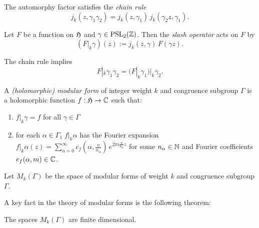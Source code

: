 \begin{lemma}\label{lemma-automorphy-factor-chain-rule}
    The automorphy factor satisfies the \emph{chain rule}
$$j_k(z,\gamma_1\gamma_2)=j_k(z,\gamma_1)\,j_k(\gamma_2z,\gamma_1). $$
\end{lemma}

\begin{definition}\label{def-slash-operator}
    Let $F$ be a  function on $\mathfrak{H}$ and $\gamma\in\mathrm{PSL}_2(\mathbb{Z})$. Then the \emph{slash operator} acts on $F$ by
$$(F|_k\gamma)(z):=j_k(z,\gamma)\,F(\gamma z). $$
\end{definition}

\begin{lemma}\label{lemma-slash-operator-chail-rule}
    The chain rule implies
$$F|_k\gamma_1\gamma_2=(F|_k\gamma_1)|_k\gamma_2.$$
\end{lemma}

\begin{definition}\label{def-holomorphic-modular-form}%
A \emph{(holomorphic) modular form} of integer weight $k$ and congruence subgroup $\Gamma$ is a holomorphic function $f:\mathfrak{H}\to\mathbb{C}$ such that:
\begin{enumerate}
  \item $f|_k\gamma=f$ for all $\gamma\in\Gamma$
  \item for each $\alpha\in\Gamma_1\;f|_k\alpha$ has the Fourier expansion $f|_k\alpha (z)=\sum_{n=0}^\infty c_f(\alpha,\frac{n}{n_\alpha})\,e^{2\pi i \frac{n}{n_\alpha}z}$ for some $n_\alpha\in\mathbb{N}$ and Fourier coefficients $c_f(\alpha,m)\in\mathbb{C}$.
\end{enumerate}
\end{definition}

\begin{definition}\label{def-Mk}
    Let $M_k(\Gamma)$ be the space of modular forms of weight $k$ and congruence subgroup $\Gamma$.
\end{definition}

A key fact in the theory of modular forms is the following theorem:
\begin{theorem}\label{theorem-Mk-finite-dimensional}
    The spaces $M_k(\Gamma)$ are finite dimensional.
\end{theorem}

